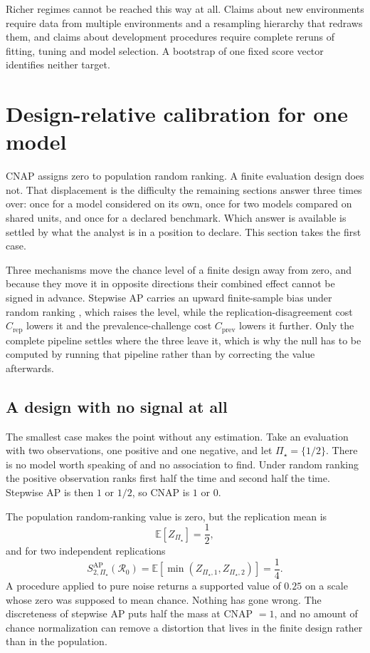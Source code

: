 \documentclass[11pt]{article}
\newcommand{\Regime}{\mathcal{R}}
\newcommand{\PSet}{\Pi_\star}
\newcommand{\E}{\mathbb{E}}
\theoremstyle{remark}
\begin{document}
Richer regimes cannot be reached this way at all. Claims about new environments require data from multiple environments and a resampling hierarchy that redraws them, and claims about development procedures require complete reruns of fitting, tuning and model selection. A bootstrap of one fixed score vector identifies neither target.

\section{Design-relative calibration for one model}
\label{sec:calibration}

CNAP assigns zero to population random ranking. A finite evaluation design does not. That displacement is the difficulty the remaining sections answer three times over: once for a model considered on its own, once for two models compared on shared units, and once for a declared benchmark. Which answer is available is settled by what the analyst is in a position to declare. This section takes the first case.

Three mechanisms move the chance level of a finite design away from zero, and because they move it in opposite directions their combined effect cannot be signed in advance. Stepwise AP carries an upward finite-sample bias under random ranking \cite{bestgen2015random}, which raises the level, while the replication-disagreement cost $C_{\mathrm{rep}}$ lowers it and the prevalence-challenge cost $C_{\mathrm{prev}}$ lowers it further. Only the complete pipeline settles where the three leave it, which is why the null has to be computed by running that pipeline rather than by correcting the value afterwards.

\subsection{A design with no signal at all}

The smallest case makes the point without any estimation. Take an evaluation with two observations, one positive and one negative, and let $\PSet=\{1/2\}$. There is no model worth speaking of and no association to find. Under random ranking the positive observation ranks first half the time and second half the time. Stepwise AP is then $1$ or $1/2$, so CNAP is $1$ or $0$.

The population random-ranking value is zero, but the replication mean is
\[
\E[Z_{\PSet}]
=
\frac12,
\]
and for two independent replications
\[
S_{2,\PSet}^{\mathrm{AP}}(\Regime_0)
=
\E[\min(Z_{\PSet,1},Z_{\PSet,2})]
=
\frac14.
\]
A procedure applied to pure noise returns a supported value of $0.25$ on a scale whose zero was supposed to mean chance. Nothing has gone wrong. The discreteness of stepwise AP puts half the mass at CNAP $=1$, and no amount of chance normalization can remove a distortion that lives in the finite design rather than in the population.
\end{document}

